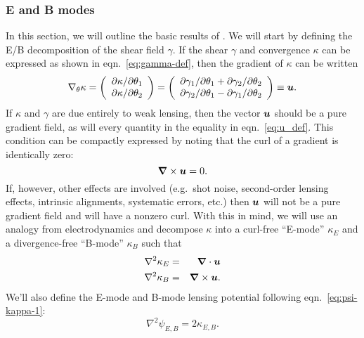 \subsubsection{E and B modes}
\label{sec:EBmode}
In this section, we will outline the basic results of \citet{Schneider02b}.
We will start by defining the E/B decomposition of the shear field $\gamma$.
If the shear $\gamma$ and convergence $\kappa$ can be expressed as shown
in eqn.~\ref{eq:gamma-def}, then the gradient of $\kappa$ can be written
\begin{equation}
  \label{eq:u_def}
  \nabla_\theta \kappa =
  \left(
  \begin{array}{l}
    \partial \kappa / \partial\theta_1\\
    \partial \kappa / \partial\theta_2 
  \end{array}
  \right) 
  =
  \left(
  \begin{array}{l}
    \partial \gamma_1 / \partial\theta_1 + \partial\gamma_2/\partial\theta_2\\
    \partial \gamma_2 / \partial\theta_1 - \partial\gamma_1/\partial\theta_2
  \end{array}
  \right)
  \equiv
  \boldsymbol{u}.
\end{equation}
If $\kappa$ and $\gamma$ are due entirely to weak lensing, then the vector
$\boldsymbol{u}$ should be a pure gradient field, as will every
quantity in the equality in eqn.~\ref{eq:u_def}.  This condition can be
compactly expressed by noting that the curl of a gradient is identically
zero:
\begin{equation}
  \label{eq:curl-free}
  \boldsymbol{\nabla} \times \boldsymbol{u} = 0.
\end{equation}
If, however, other effects are involved (e.g.~shot noise, second-order
lensing effects, intrinsic alignments, systematic errors, etc.)
then $\boldsymbol{u}$ will not be a pure gradient field and will have
a nonzero curl.
With this in mind, we will use an analogy from electrodynamics and decompose
$\kappa$ into a curl-free ``E-mode'' $\kappa_E$ and a divergence-free
``B-mode'' $\kappa_B$ such that
\begin{eqnarray}
  \nabla^2 \kappa_E &=& \boldsymbol{\nabla} \cdot \boldsymbol{u}\\
  \nabla^2 \kappa_B &=& \boldsymbol{\nabla} \times \boldsymbol{u}.
\end{eqnarray}
We'll also define the E-mode and B-mode lensing potential following
eqn.~\ref{eq:psi-kappa-1}:
\begin{equation}
  \nabla^2 \psi_{E, B} = 2\kappa_{E, B}.
\end{equation}
